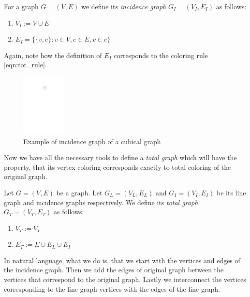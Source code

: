 \begin{defn}
    For a graph $G=(V,E)$ we define its \emph{incidence graph} $G_I=(V_I,E_I)$ as follows:
    \begin{enumerate}
        \item $V_I := V \cup E$
        \item $E_I = \{\{v,e\} : v \in V, e \in E, v \in e \}$
    \end{enumerate}
\end{defn}

Again, note how the definition of $E_I$ corresponds to the coloring rule \ref{eqn:tot_rule}.

\begin{figure}[H]
    \centering
    \includegraphics[width=0.2\textwidth]{../Resources/Figs/cubical_incid_graph.pdf}
    \caption{Example of incidence graph of a cubical graph}
    \label{fig:cubical_incid_graph}
\end{figure}

Now we have all the necessary tools to define a \textit{total graph} which will have the property, that its vertex coloring corresponds exactly to total coloring of the original graph.

\begin{defn}
    Let $G=(V,E)$ be a graph. Let $G_L =(V_L,E_L)$ and $G_I=(V_I,E_I)$ be its line graph and incidence graphs respectively. We define its \emph{total graph} $G_T=(V_T,E_T)$ as follows:
    \begin{enumerate}
        \item $V_T := V_I$
        \item $E_T := E \cup E_L \cup E_I$
    \end{enumerate}
\end{defn}

In natural language, what we do is, that we start with the vertices and edges of the incidence graph. Then we add the edges of original graph between the vertices that correspond to the original graph. Lastly we interconnect the vertices corresponding to the line graph vertices with the edges of the line graph.


